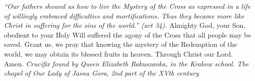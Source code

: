 \pagestyle{empty}
\hspace{0pt}
\vfill

\textit{``Our fathers showed us how to live the Mystery of the
Cross as expressed in a life of willingly embraced difficulties and
mortifications. Thus they became more like Christ in suffering for
the sins of the world.'' (art 34).}
\medbreak
Almighty God, your Son, obedient to your Holy Will suffered the agony of the Cross that all people may be saved. Grant
us, we pray that knowing the mystery of the Redemption of the
world, we may obtain its blessed fruits in heaven. Through Christ
our Lord. Amen.
\vfill
\textit{Crucifix found by Queen Elizabeth Rakuszanka, in the Krakow
school. The chapel of Our Lady of Jasna Gora, 2nd part of the
XVth century}
\hspace{0pt}
\newpage
